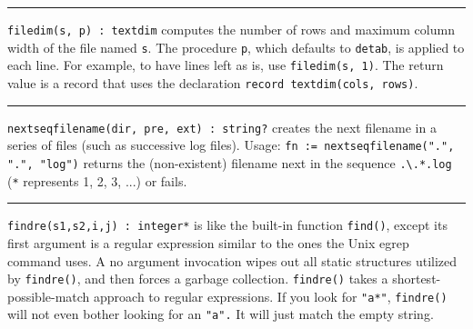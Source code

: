 \vspace{0.25cm}\hrule{}

\texttt{filedim(s, p) : textdim} computes the number of rows and maximum
column width of the file named \texttt{s}. The procedure \texttt{p},
which defaults to \texttt{detab}, is applied to each line. For example,
to have lines left as is, use \texttt{filedim(s, 1)}. The return value
is a record that uses the declaration \texttt{record textdim(cols,
rows)}. 

\vspace{0.25cm}\hrule{}

\texttt{nextseqfilename(dir, pre, ext) : string?} creates the next
filename in a series of files (such as successive
log files). Usage: \texttt{fn :=
nextseqfilename(".", ".", "log")}
returns the (non-existent) filename next in the sequence
\texttt{.{\textbackslash}.*.log} (\texttt{*} represents 1, 2, 3, ...)
or fails.

\vspace{0.25cm}\hrule{}

\texttt{findre(s1,s2,i,j) : integer*} is like the built-in function
\texttt{find()}, except its first argument is a regular expression similar to the ones the Unix
egrep command uses. A no argument invocation wipes out all
static structures utilized by \texttt{findre()}, and
then forces a garbage collection.
\texttt{findre()} takes a shortest-possible-match approach to regular
expressions. If you look for \texttt{"a*"},
\texttt{findre()} will not even bother looking for an
\texttt{"a"}\texttt{.} It will just match
the empty string.

